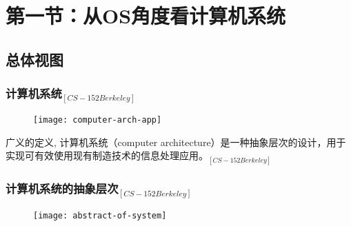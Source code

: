 \section{第一节：从OS角度看计算机系统 } %



\subsection{总体视图} 

\begin{frame}
    
    \frametitle{{计算机系统$_{[CS-152 Berkeley]}$}}
    
    \begin{figure}
        \centering
        \texttt{[image: computer-arch-app]}
    \end{figure}
    \pause
    
    广义的定义, 计算机系统（computer architecture）是一种抽象层次的设计，用于实现可有效使用现有制造技术的信息处理应用。$_{[CS-152 Berkeley]}$
\end{frame}


\begin{frame}
    
    \frametitle{{计算机系统的抽象层次$ _{[CS-152 Berkeley]} $}}
    
    \begin{figure}
        \centering
        \texttt{[image: abstract-of-system]}
    \end{figure}
    
\end{frame}



